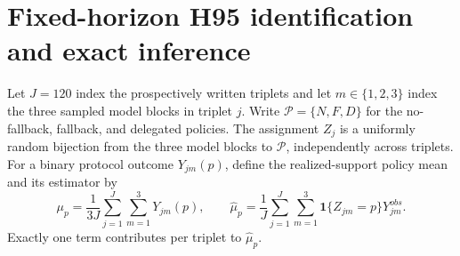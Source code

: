 \documentclass[11pt]{article}
\newcommand{\1}{\mathbf{1}}
\begin{document}
\section{Fixed-horizon H95 identification and exact inference}
\label{app:h95-proof}

Let $J=120$ index the prospectively written triplets and let $m\in\{1,2,3\}$
index the three sampled model blocks in triplet $j$.  Write
$\mathcal P=\{N,F,D\}$ for the no-fallback, fallback, and delegated policies.
The assignment $Z_j$ is a uniformly random bijection from the three model blocks
to $\mathcal P$, independently across triplets.  For a binary protocol outcome
$Y_{jm}(p)$, define the realized-support policy mean and its estimator by
\begin{equation}
 \mu_p=\frac{1}{3J}\sum_{j=1}^J\sum_{m=1}^3Y_{jm}(p),
 \qquad
 \widehat\mu_p=\frac{1}{J}\sum_{j=1}^J\sum_{m=1}^3
 \1\{Z_{jm}=p\}Y_{jm}^{obs}.
 \label{eq:h95-policy-mean}
\end{equation}
Exactly one term contributes per triplet to $\widehat\mu_p$.
\end{document}
